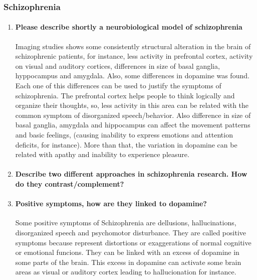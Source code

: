 \documentclass[12pt,article,oneside,a4paper]{memoir}
\begin{document}
\subsubsection{Schizophrenia}
\begin{enumerate}
\item \paragraph{Please describe shortly a neurobiological model of
schizophrenia}\label{question:neurobiology-schizophrenia}
Imaging studies shows some consistently structural alteration in the brain of
schizophrenic patients, for instance, less activity in prefrontal cortex,
activity on visual and auditory cortices, differences in size of basal ganglia,
hyppocampus and amygdala. Also, some differences in dopamine was found.
Each one of this differences can be used to justify the symptoms of
schizophrenia.
The prefrontal cortex helps people to think logically and organize their
thoughts, so, less activity in this area can be related with the common symptom
of disorganized speech/behavior. Also difference in  size of basal ganglia,
amygdala and hippocampus can affect the movement patterns and basic feelings,
(causing inability to express emotions and attention deficits, for instance).
More than that, the variation in dopamine can be related with apathy and
inability to experience pleasure.

\item \paragraph{Describe two different approaches in schizophrenia research.
How do they contrast/complement?}

\item \paragraph{Positive symptoms, how are they linked to dopamine?}
Some positive symptoms of Schizophrenia are dellusions, hallucinations,
disorganized speech and psychomotor disturbance. They are called positive
symptoms because represent distortions or exaggerations of normal cognitive or
emotional funcions. They can be linked with an excess of dopamine in some parts
of the brain. This excess in dopamine can activate some brain areas as visual
or auditory cortex leading to hallucionation for instance.


\end{enumerate}
\end{document}
